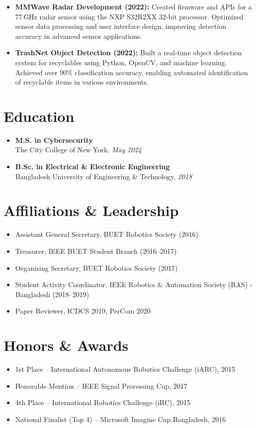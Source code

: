 \documentclass[11pt]{article}
\begin{document}
\begin{itemize}
    \item \textbf{MMWave Radar Development (2022):}
        Created firmware and APIs for a 77\,GHz radar sensor using the NXP S32R2XX 32-bit processor. Optimized sensor data processing and user interface design, improving detection accuracy in advanced sensor applications.

    \item \textbf{TrashNet Object Detection (2022):}
        Built a real-time object detection system for recyclables using Python, OpenCV, and machine learning. Achieved over 90\% classification accuracy, enabling automated identification of recyclable items in various environments.
\end{itemize}


\section*{Education}
\begin{itemize}
    \item \textbf{M.S. in Cybersecurity} \\[3pt]
          The City College of New York, \textit{May 2024}
    \item \textbf{B.Sc. in Electrical \& Electronic Engineering} \\[3pt]
          Bangladesh University of Engineering \& Technology, \textit{2018}
\end{itemize}
\section*{Affiliations \& Leadership}
\begin{itemize}
    \item Assistant General Secretary, BUET Robotics Society (2016)
    \item Treasurer, IEEE BUET Student Branch (2016--2017)
    \item Organizing Secretary, BUET Robotics Society (2017)
    \item Student Activity Coordinator, IEEE Robotics \& Automation Society (RAS) - Bangladesh (2018--2019)
    \item Paper Reviewer, ICDCS 2019, PerCom 2020
\end{itemize}

\section*{Honors \& Awards}
\begin{itemize}
    \item 1st Place -- International Autonomous Robotics Challenge (iARC), 2015
    \item Honorable Mention -- IEEE Signal Processing Cup, 2017
    \item 4th Place -- International Robotics Challenge (iRC), 2015
    \item National Finalist (Top 4) -- Microsoft Imagine Cup Bangladesh, 2016
\end{itemize}
\end{document}
